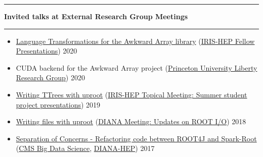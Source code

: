 \documentclass[10pt, letterpaper]{article}
\newcommand{\Section}[1]{
    \Line \par
    \vspace{1pt}
    \textbf{\fontsize{13}{13}\selectfont #1} \par
    \vspace{-7pt}
    \Line \par
    \vspace{3pt}
}
\newcommand{\Line}{
\noindent\rule{\textwidth}{0.4pt}}
\newenvironment{tightitemize}
{
    \vspace{-\topsep}
    \begin{itemize}
        \itemsep2pt \parskip0pt \parsep0pt
}
{
    \end{itemize}
    \vspace{-\topsep}
}
\begin{document}
\Section{Invited talks at External Research Group Meetings}
\begin{tightitemize}
\item \href{https://indico.cern.ch/event/946427/contributions/3976986/attachments/2094014/3519161/IRIS-HEP-Fellow-Awkward.pdf}{Language Transformations for the Awkward Array library} (\href{https://indico.cern.ch/event/946427/}{IRIS-HEP Fellow Presentations}) \hfill{2020}
\item CUDA backend for the Awkward Array project (\href{https://liberty.princeton.edu/}{Princeton University Liberty Research Group}) \hfill{2020}
\item \href{https://indico.cern.ch/event/840667/contributions/3527109/attachments/1908764/3153297/uproot-irisfellow-final.pdf}{Writing TTrees with uproot} (\href{https://indico.cern.ch/event/840667/}{IRIS-HEP Topical Meeting: Summer student project presentations}) \hfill{2019}
\item \href{https://indico.cern.ch/event/754335/contributions/3166239/attachments/1734208/2804184/Writing_files_with_uproot_-_DIANA_HEP.pdf}{Writing files with uproot} (\href{https://indico.cern.ch/event/754335/}{DIANA Meeting: Updates on ROOT I/O}) \hfill{2018}
\item \href{https://indico.cern.ch/event/658754/contributions/2685907/attachments/1506368/2347492/Refactoring_code_from_spark-root_to_root4j.pdf}{Separation of Concerns - Refactoring code between ROOT4J and Spark-Root} (\href{https://indico.cern.ch/event/658754/}{CMS Big Data Science}, \href{https://indico.cern.ch/event/655833/}{DIANA-HEP}) \hfill{2017}
\end{tightitemize}
\end{document}
